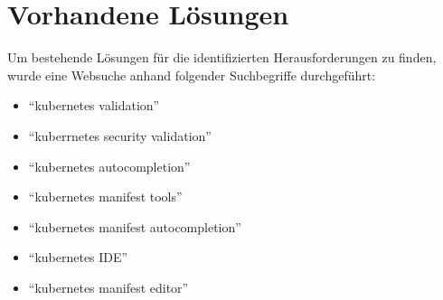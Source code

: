 \section{Vorhandene Lösungen}

Um bestehende Lösungen für die identifizierten Herausforderungen zu finden, wurde eine Websuche anhand folgender Suchbegriffe durchgeführt:
\begin{itemize}
    \setlength\itemsep{-0.5cm}
    \item ``kubernetes validation''
    \item ``kuberrnetes security validation''
    \item ``kubernetes autocompletion''
    \item ``kubernetes manifest tools''
    \item ``kubernetes manifest autocompletion''
    \item ``kubernetes IDE''
    \item ``kubernetes manifest editor''
\end{itemize}


